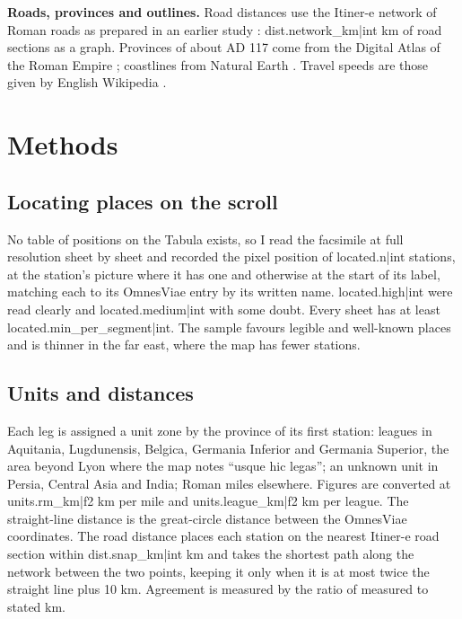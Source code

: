 \documentclass[11pt,a4paper]{article}
\begin{document}
\textbf{Roads, provinces and outlines.} Road distances use the Itiner-e network of Roman roads \citep{itinere} as prepared in an earlier study \citep{romanroads}: {{dist.network_km|int}} km of road sections as a graph. Provinces of about AD 117 come from the Digital Atlas of the Roman Empire \citep{dare}; coastlines from Natural Earth \citep{naturalearth}. Travel speeds are those given by English Wikipedia \citep{wiki}.

\section{Methods}
\subsection{Locating places on the scroll}
No table of positions on the Tabula exists, so I read the facsimile at full resolution sheet by sheet and recorded the pixel position of {{located.n|int}} stations, at the station's picture where it has one and otherwise at the start of its label, matching each to its OmnesViae entry by its written name. {{located.high|int}} were read clearly and {{located.medium|int}} with some doubt. Every sheet has at least {{located.min_per_segment|int}}. The sample favours legible and well-known places and is thinner in the far east, where the map has fewer stations.

\subsection{Units and distances}
Each leg is assigned a unit zone by the province of its first station: leagues in Aquitania, Lugdunensis, Belgica, Germania Inferior and Germania Superior, the area beyond Lyon where the map notes ``usque hic legas''; an unknown unit in Persia, Central Asia and India; Roman miles elsewhere. Figures are converted at {{units.rm_km|f2}} km per mile and {{units.league_km|f2}} km per league. The straight-line distance is the great-circle distance between the OmnesViae coordinates. The road distance places each station on the nearest Itiner-e road section within {{dist.snap_km|int}} km and takes the shortest path along the network between the two points, keeping it only when it is at most twice the straight line plus 10 km. Agreement is measured by the ratio of measured to stated km.
\end{document}
